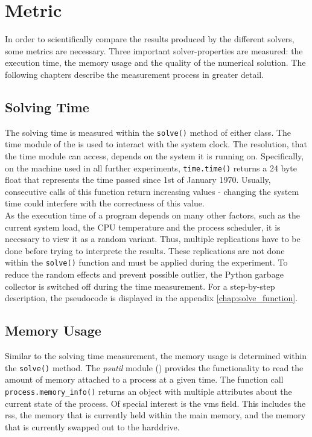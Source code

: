 \documentclass[./\jobname.tex]{subfiles}
\begin{document}
\section{Metric} 
\label{chap:metric}
In order to scientifically compare the results produced by the different solvers, some metrics are necessary. Three important solver-properties are measured: the execution time, the memory usage and the quality of the numerical solution. The following chapters describe the measurement process in greater detail. 

\subsection{Solving Time}
\label{chap:metric_time}
The solving time is measured within the \colorbox{light-gray}{\lstinline[basicstyle=\ttfamily\color{black}]|solve()|} method of either class. The time module of the \cite{python_standard_library_time_2020} is used to interact with the system clock. The resolution, that the time module can access, depends on the system it is running on. Specifically, on the machine used in all further experiments, \colorbox{light-gray}{\lstinline[basicstyle=\ttfamily\color{black}]|time.time()|} returns a 24 byte float that represents the time passed since 1st of January 1970. Usually, consecutive calls of this function return increasing values - changing the system time could interfere with the correctness of this value.\\ 

As the execution time of a program depends on many other factors, such as the current system load, the CPU temperature and the process scheduler, it is necessary to view it as a random variant. Thus, multiple replications have to be done before trying to interprete the results. These replications are not done within the \colorbox{light-gray}{\lstinline[basicstyle=\ttfamily\color{black}]|solve()|} function and must be applied during the experiment. To reduce the random effects and prevent possible outlier, the Python garbage collector is switched off during the time measurement. For a step-by-step description, the pseudocode is displayed in the appendix \ref{chap:solve_function}. 

\subsection{Memory Usage}
\label{chap:metric_mem}
Similar to the solving time measurement, the memory usage is determined within the \colorbox{light-gray}{\lstinline[basicstyle=\ttfamily\color{black}]|solve()|} method. The \textit{psutil} module (\cite{rodola_psutil_2020}) provides the functionality to read the amount of memory attached to a process at a given time. The function call \colorbox{light-gray}{\lstinline[basicstyle=\ttfamily\color{black}]|process.memory_info()|} returns an object with multiple attributes about the current state of the process. Of special interest is the \gls{vms} field. This includes the \gls{rss}, the memory that is currently held within the main memory, and the memory that is currently swapped out to the harddrive.
\end{document}
